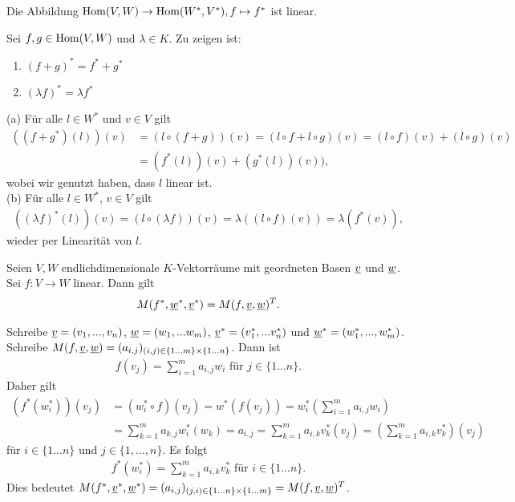 \documentclass[../../main.tex]{subfiles}
\begin{document}
\begin{pro}\label{13.1.10}
Die Abbildung $\operatorname{Hom}(V,W)\to \operatorname{Hom}(W^*,V^*), f\mapsto f^*$ ist linear.
\end{pro}
\begin{cproof}
Sei $f,g\in \operatorname{Hom}(V,W)$ und $\lambda\in K$. Zu zeigen ist:
\begin{enumerate}[\normalfont(a)]
\item $(f+g)^*=f^*+g^*$
\item $(\lambda f)^*=\lambda f^*$
\end{enumerate}
(a) Für alle $l\in W^*$ und $v\in V$ gilt
\begin{align*}
((f+g^*)(l))(v)&=(l\circ (f+g))(v)=(l\circ f+l\circ g)(v)=(l\circ f)(v)+(l\circ g)(v)\\
&=(f^*(l))(v)+(g^*(l))(v)),
\end{align*}
wobei wir genutzt haben, dass $l$ linear ist.\\
	
\noindent(b) Für alle $l\in W^*$, $v\in V$ gilt
\begin{align*}
((\lambda f)^*(l))(v)=(l\circ (\lambda f))(v)=\lambda((l\circ f)(v))=\lambda(f^*(v)),
\end{align*}
wieder per Linearität von $l$.
\end{cproof}

\begin{pro}\label{13.1.11}
Seien $V,W$ endlichdimensionale $K$-Vektorräume mit geordneten Basen ${\underline v}$ und ${\underline w}$. Sei $f: V\to W$ linear. Dann gilt
\begin{align*}
M(f^*,{\underline w}^*,{\underline v}^*)=M(f,{\underline v},{\underline w})^T.
\end{align*}
\end{pro}
\begin{cproof}
Schreibe ${\underline v}=(v_1,...,v_n)$, ${\underline w}=(w_1,...w_m)$, ${\underline v}^*=(v_1^*,...v_n^*)$ und ${\underline w}^*=(w_1^*,...,w_m^*)$. Schreibe $M(f,{\underline v},{\underline w})=(a_{i,j})_{(i,j)\in \{1...m\}\times\{1...n\}}$. Dann ist
\begin{align*}
f(v_j)=\sum^m_{i=1}a_{i,j}w_i \text{ für } j\in\{1...n\}.
\end{align*}
Daher gilt
\begin{align*}
(f^*(w_i^*))(v_j)&=(w_i^*\circ f)(v_j)=w^*(f(v_j))=w^*_i\left(\sum^m_{i=1}a_{i,j}w_i \right)\\
&=\sum^m_{k=1}a_{k,j}w_i^*(w_k)=a_{i,j}=\sum^m_{k=1}a_{i,k}v_k^*(v_j)=\left(\sum^m_{k=1}a_{i,k}v_k^*\right)(v_j)
\end{align*}
für $i\in\{1...n\}$ und $j\in\{1,...,n\}$. Es folgt
\begin{align*}
f^*(w_i^*)=\sum^m_{k=1}a_{i,k}v_k^*\text{ für }i\in\{1...n\}.
\end{align*}
Dies bedeutet $M(f^*,{\underline v}^*,{\underline w}^*)=(a_{i,j})_{(j,i)\in \{1...n\}\times\{1...m\}}=M(f,\underline{v},\underline{w})^T$.
\end{cproof}
	
\end{document}
